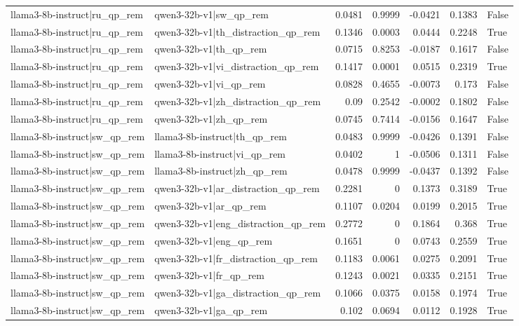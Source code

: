\begin{table}
\begin{tabular}{l l r r r r l}
llama3-8b-instruct|ru_qp_rem & qwen3-32b-v1|sw_qp_rem & 0.0481 & 0.9999 & -0.0421 & 0.1383 & False \\
llama3-8b-instruct|ru_qp_rem & qwen3-32b-v1|th_distraction_qp_rem & 0.1346 & 0.0003 & 0.0444 & 0.2248 & True \\
llama3-8b-instruct|ru_qp_rem & qwen3-32b-v1|th_qp_rem & 0.0715 & 0.8253 & -0.0187 & 0.1617 & False \\
llama3-8b-instruct|ru_qp_rem & qwen3-32b-v1|vi_distraction_qp_rem & 0.1417 & 0.0001 & 0.0515 & 0.2319 & True \\
llama3-8b-instruct|ru_qp_rem & qwen3-32b-v1|vi_qp_rem & 0.0828 & 0.4655 & -0.0073 & 0.173 & False \\
llama3-8b-instruct|ru_qp_rem & qwen3-32b-v1|zh_distraction_qp_rem & 0.09 & 0.2542 & -0.0002 & 0.1802 & False \\
llama3-8b-instruct|ru_qp_rem & qwen3-32b-v1|zh_qp_rem & 0.0745 & 0.7414 & -0.0156 & 0.1647 & False \\
llama3-8b-instruct|sw_qp_rem & llama3-8b-instruct|th_qp_rem & 0.0483 & 0.9999 & -0.0426 & 0.1391 & False \\
llama3-8b-instruct|sw_qp_rem & llama3-8b-instruct|vi_qp_rem & 0.0402 & 1 & -0.0506 & 0.1311 & False \\
llama3-8b-instruct|sw_qp_rem & llama3-8b-instruct|zh_qp_rem & 0.0478 & 0.9999 & -0.0437 & 0.1392 & False \\
llama3-8b-instruct|sw_qp_rem & qwen3-32b-v1|ar_distraction_qp_rem & 0.2281 & 0 & 0.1373 & 0.3189 & True \\
llama3-8b-instruct|sw_qp_rem & qwen3-32b-v1|ar_qp_rem & 0.1107 & 0.0204 & 0.0199 & 0.2015 & True \\
llama3-8b-instruct|sw_qp_rem & qwen3-32b-v1|eng_distraction_qp_rem & 0.2772 & 0 & 0.1864 & 0.368 & True \\
llama3-8b-instruct|sw_qp_rem & qwen3-32b-v1|eng_qp_rem & 0.1651 & 0 & 0.0743 & 0.2559 & True \\
llama3-8b-instruct|sw_qp_rem & qwen3-32b-v1|fr_distraction_qp_rem & 0.1183 & 0.0061 & 0.0275 & 0.2091 & True \\
llama3-8b-instruct|sw_qp_rem & qwen3-32b-v1|fr_qp_rem & 0.1243 & 0.0021 & 0.0335 & 0.2151 & True \\
llama3-8b-instruct|sw_qp_rem & qwen3-32b-v1|ga_distraction_qp_rem & 0.1066 & 0.0375 & 0.0158 & 0.1974 & True \\
llama3-8b-instruct|sw_qp_rem & qwen3-32b-v1|ga_qp_rem & 0.102 & 0.0694 & 0.0112 & 0.1928 & True \\

\end{tabular}
\end{table}
